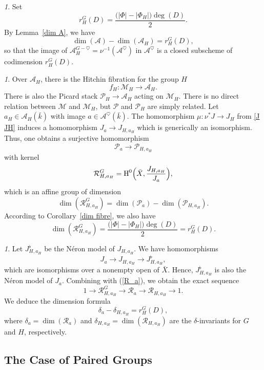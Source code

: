 \documentclass[12pt,english]{smfart}
\numberwithin{equation}{subsection}
\theoremstyle{remark}
\newtheorem{numero}[equation]{}
\begin{document}
\begin{numero}\label{codim A_H}
Set
$$
r_H^G(D)=\frac{\bigl(|\Phi|-|\Phi_H|\bigr)\deg(D)}{2}.
$$
By Lemma~\ref{dim A}, we have
$$
\dim(\mathcal{A})-\dim(\mathcal{A}_H)=r_H^G(D),
$$
so that the image of $\mathcal{A}_H^{G-\heartsuit}=\nu^{-1}(\mathcal{A}^\heartsuit)$ in $\mathcal{A}^\heartsuit$
is a closed subscheme of codimension $r_H^G(D)$.
\end{numero}

\begin{numero}
Over $\mathcal{A}_H$, there is the Hitchin fibration for the group $H$
$$
f_H:\mathcal{M}_H\rightarrow \mathcal{A}_H.
$$
There is also the Picard stack $\mathcal{P}_H\rightarrow \mathcal{A}_H$ acting on $\mathcal{M}_H$.
There is no direct relation between $\mathcal{M}$ and $\mathcal{M}_H$, but $\mathcal{P}$ and $\mathcal{P}_H$
are simply related. Let $a_H\in\mathcal{A}_H(\bar{k})$ with image $a\in\mathcal{A}^\heartsuit(\bar{k})$.
The homomorphism $\mu:\nu^* J\rightarrow J_H$ from \ref{J JH} induces a homomorphism $J_a\rightarrow J_{H,a_H}$ which
is generically an isomorphism. Thus, one obtains a surjective homomorphism
$$
\mathcal{P}_a\rightarrow \mathcal{P}_{H,a_H}
$$
with kernel
$$
\mathcal{R}_{H,a_H}^G=\operatorname{H}^0\Bigl(\bar X,\frac{J_{H,a_H}}{J_a}\Bigr),
$$
which is an affine group of dimension
$$
\dim(\mathcal{R}_{H,a_H}^G)=\dim(\mathcal{P}_a)-\dim(\mathcal{P}_{H,a_H}).
$$
According to Corollary~\ref{dim fibre}, we also have
$$
\dim(\mathcal{R}_{H,a_H}^G)=\frac{\bigl(|\Phi|-|\Phi_H|\bigr)\deg(D)}{2}=r_H^G(D).
$$
\end{numero}

\begin{numero}\label{delta-dellta_H}
Let $J_{H,a_H}^\flat$ be the N\'eron model of $J_{H,a_H}$. We have homomorphisms
$$
J_a\rightarrow J_{H,a_H}\rightarrow J_{H,a_H}^\flat,
$$
which are isomorphisms over a nonempty open of $\bar X$. Hence, $J_{H,a_H}^\flat$ is also the N\'eron model of $J_a$.
Combining with (\ref{R_a}), we obtain the exact sequence
$$
1\rightarrow \mathcal{R}_{H,a_H}^G\rightarrow \mathcal{R}_a\rightarrow \mathcal{R}_{H,a_H}\rightarrow 1.
$$
We deduce the dimension formula
$$
\delta_a-\delta_{H,a_H}=r_H^G(D),
$$
where $\delta_a=\dim(\mathcal{R}_a)$ and $\delta_{H,a_H}=\dim(\mathcal{R}_{H,a_H})$ are the $\delta$-invariants for $G$ and $H$, respectively.
\end{numero}

\subsection{The Case of Paired Groups}\label{Hitchin apparies}
\end{document}
